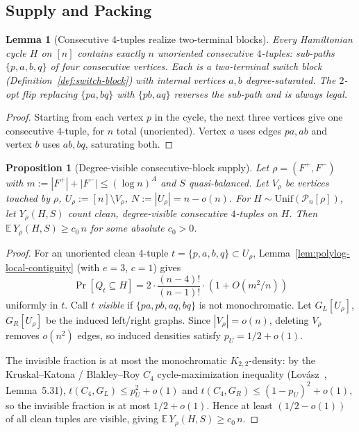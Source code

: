 \documentclass[11pt]{article}
\newtheorem{lemma}[theorem]{Lemma}
\newtheorem{proposition}[theorem]{Proposition}
\begin{document}
\subsection{Supply and Packing}

\begin{lemma}[Consecutive 4-tuples realize two-terminal blocks]
\label{lem:consecutive-blocks}
Every Hamiltonian cycle $H$ on $[n]$ contains exactly $n$ unoriented consecutive
$4$-tuples: sub-paths $\{p, a, b, q\}$ of four consecutive vertices.
Each is a two-terminal switch block (Definition~\ref{def:switch-block}) with
internal vertices $a, b$ degree-saturated.  The $2$-opt flip replacing
$\{pa, bq\}$ with $\{pb, aq\}$ reverses the sub-path and is always legal.
\end{lemma}

\begin{proof}
Starting from each vertex $p$ in the cycle, the next three vertices give one
consecutive $4$-tuple, for $n$ total (unoriented).  Vertex $a$ uses edges
$pa, ab$ and vertex $b$ uses $ab, bq$, saturating both.
\end{proof}

\begin{proposition}[Degree-visible consecutive-block supply]
\label{prop:consecutive-supply}
Let $\rho = (F^+, F^-)$ with $m := |F^+| + |F^-| \le (\log n)^A$ and $S$
quasi-balanced.  Let $V_\rho$ be vertices touched by $\rho$,
$U_\rho := [n] \setminus V_\rho$, $N := |U_\rho| = n - o(n)$.
For $H \sim \mathrm{Unif}(\mathcal{P}_n[\rho])$, let $Y_\rho(H,S)$ count
clean, degree-visible consecutive $4$-tuples on $H$.  Then
$\mathbb{E}\,Y_\rho(H,S) \ge c_0\,n$ for some absolute $c_0 > 0$.
\end{proposition}

\begin{proof}
For an unoriented clean $4$-tuple $t = \{p,a,b,q\} \subset U_\rho$,
Lemma~\ref{lem:polylog-local-contiguity} (with $e = 3$, $c = 1$) gives
\[
\Pr[Q_t \subseteq H] = 2 \cdot \frac{(n-4)!}{(n-1)!} \cdot (1 + O(m^2/n))
\]
uniformly in $t$.  Call $t$ \emph{visible} if $\{pa, pb, aq, bq\}$ is not
monochromatic.  Let $G_L[U_\rho]$, $G_R[U_\rho]$ be the induced left/right
graphs.  Since $|V_\rho| = o(n)$, deleting $V_\rho$ removes $o(n^2)$ edges,
so induced densities satisfy $p_U = 1/2 + o(1)$.

The invisible fraction is at most the monochromatic $K_{2,2}$-density:
by the Kruskal--Katona / Blakley--Roy $C_4$ cycle-maximization inequality
(Lov\'asz~\cite{Lovasz12}, Lemma~5.31),
$t(C_4, G_L) \le p_U^2 + o(1)$ and $t(C_4, G_R) \le (1-p_U)^2 + o(1)$,
so the invisible fraction is at most $1/2 + o(1)$.  Hence at least
$(1/2 - o(1))$ of all clean tuples are visible, giving
$\mathbb{E}\,Y_\rho(H,S) \ge c_0\,n$.
\end{proof}
\end{document}
